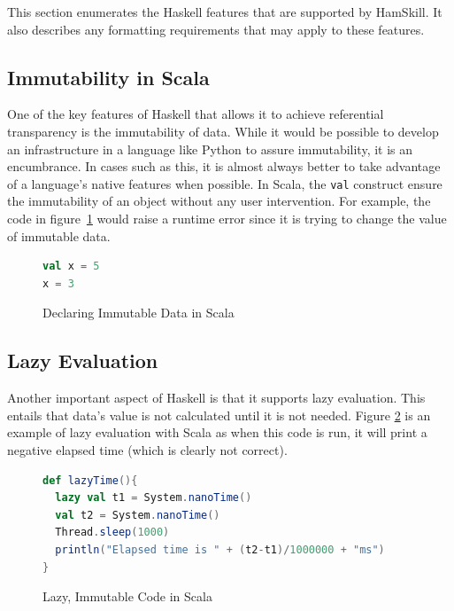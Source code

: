 \documentclass{report}
\begin{document}
This section enumerates the Haskell features that are supported by HamSkill.  It also describes any formatting requirements that may apply to these features.

\subsection{Immutability in Scala}\label{sec:immutabilityScala}

One of the key features of Haskell that allows it to achieve referential transparency is the immutability of data.  While it would be possible to develop an infrastructure in a language like Python to assure immutability, it is an encumbrance.  In cases such as this, it is almost always better to take advantage of a language's native features when possible.  In Scala, the {\tt val} construct ensure the immutability of an object without any user intervention.  For example, the code in figure~\ref{fig:scalaValConstruct} would raise a runtime error since it is trying to change the value of immutable data.

\begin{figure}[H]
\begin{mdframed}
\begin{lstlisting}[language=Scala]
val x = 5
x = 3
\end{lstlisting}
\end{mdframed}
\caption{Declaring Immutable Data in Scala}\label{fig:scalaValConstruct}
\end{figure}

\subsection{Lazy Evaluation}\label{sec:lazyEvaluationScala}

Another important aspect of Haskell is that it supports lazy evaluation.  This entails that data's value is not calculated until it is not needed.  Figure \ref{fig:lazyImmutabilityInScala} is an example of lazy evaluation with Scala as when this code is run, it will print a negative elapsed time (which is clearly not correct).

\begin{figure}[H]
\begin{mdframed}
\begin{lstlisting}[language=Scala]
def lazyTime(){
  lazy val t1 = System.nanoTime()
  val t2 = System.nanoTime()
  Thread.sleep(1000)
  println("Elapsed time is " + (t2-t1)/1000000 + "ms")
}
\end{lstlisting}
\end{mdframed}
\caption{Lazy, Immutable Code in Scala}\label{fig:lazyImmutabilityInScala}
\end{figure}
\end{document}
